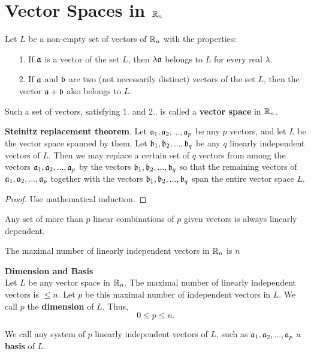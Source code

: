 \section{Vector Spaces in $\mathbb{R}_n$}

Let $L$ be a {\elevenit non-empty} set of vectors of $\mathbb{R}_n$ with the properties:
\begin{itemize}
\item[1.] If $\mathfrak{a}$ is a vector of the set $L$, then $\lambda \mathfrak{a}$ belongs to $L$ for every real $\lambda$.
\item[2.] If $\mathfrak{a}$ and $\mathfrak{b}$ are two (not necessarily distinct) vectors of the set $L$, then the vector $\mathfrak{a} +\mathfrak{b}$ also belongs to $L$.
\end{itemize}
Such a set of vectors, satisfying 1. and 2., is  called a {\bf vector space} in $\mathbb{R}_n$.

\begin{theorem} {\bf Steinitz replacement theorem}. Let $\mathfrak{a}_1, \mathfrak{a}_2, ..., \mathfrak{a}_p$ be any $p$ vectors, and let $L$ be the vector space spanned by them. Let $\mathfrak{b}_1, \mathfrak{b}_2, ..., \mathfrak{b}_q$ be any $q$ linearly independent vectors of 
$L$. Then we may replace a certain set of $q$ vectors from among the vectors $\mathfrak{a}_1, \mathfrak{a}_2, ..., \mathfrak{a}_p$ by the vectors $\mathfrak{b}_1, \mathfrak{b}_2, ...,\mathfrak{b}_q$ so that the remaining vectors of $\mathfrak{a}_1, \mathfrak{a}_2, ..., \mathfrak{a}_p$ together with the vectors $\mathfrak{b}_1, \mathfrak{b}_2, ..., \mathfrak{b}_q$ span the entire vector space $L$.\label{Th2_1}
\end{theorem}

\begin{proof}
Use mathematical induction.
\end{proof}

\begin{theorem}
Any set of more than $p$ linear combinations of $p$ given vectors is always linearly dependent.\label{Th2_2}
\end{theorem}

\begin{theorem}
The maximal number of linearly independent vectors in $\mathbb{R}_n$ is $n$\label{Th2_3}
\end{theorem}

\begin{definition}{\bf Dimension and Basis}\\
Let $L$ be any vector space in $\mathbb{R}_n$. The maximal number of linearly independent vectors is $\le n$. Let $p$ be this maximal number of independent vectors in $L$. We call $p$ the {\bf dimension} of $L$. Thus,
$$0 \le p \le n.$$

We call any system of $p$ linearly independent vectors of $L$, such as $\mathfrak{a}_1, \mathfrak{a}_2, ..., \mathfrak{a}_p$ a {\bf basis} of $L$.
\end{definition}

